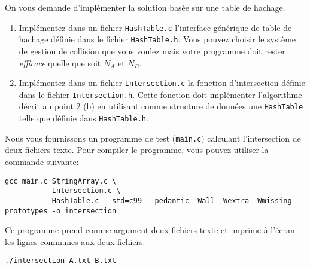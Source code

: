 \documentclass[a4paper,10pt]{article}
\begin{document}
On vous demande d'implémenter la solution basée sur une table de
hachage.

\begin{enumerate}
\item Implémentez dans un fichier \texttt{HashTable.c} l'interface générique de table de hachage définie dans le fichier \texttt{HashTable.h}.
  Vous pouvez choisir le système de gestion de collision
  que vous voulez mais votre programme doit rester {\it efficace} quelle
  que soit $N_A$ et $N_B$.
\item Implémentez dans un fichier \texttt{Intersection.c} la fonction d'intersection définie dans le fichier \texttt{Intersection.h}. Cette fonction doit implémenter l'algorithme décrit au point 2 (b) en utilisant comme structure de données une \texttt{HashTable} telle que définie dans \texttt{HashTable.h}.
\end{enumerate}

Nous vous fournissons un programme de test (\texttt{main.c}) calculant l'intersection de deux fichiers texte.
Pour compiler le programme, vous pouvez utiliser la commande suivante:

\begin{verbatim}
gcc main.c StringArray.c \
           Intersection.c \
           HashTable.c --std=c99 --pedantic -Wall -Wextra -Wmissing-prototypes -o intersection
\end{verbatim}

Ce programme prend comme argument deux fichiers texte et imprime à l'écran les lignes communes aux deux fichiers.

\begin{verbatim}
./intersection A.txt B.txt
\end{verbatim}
\end{document}

